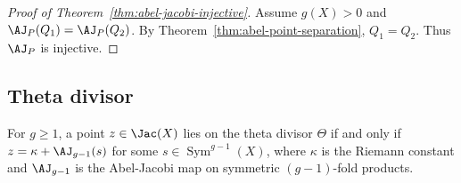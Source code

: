 \begin{proof}[Proof of Theorem~\ref{thm:abel-jacobi-injective}]
Assume \(g(X)>0\) and \(\AJ_P(Q_1)=\AJ_P(Q_2)\). By
Theorem~\ref{thm:abel-point-separation}, \(Q_1=Q_2\). Thus \(\AJ_P\) is
injective.
\end{proof}

\subsection{Theta divisor}

\begin{theorem}
\label{thm:riemann-theorem-theta-divisor}
For \(g\ge 1\), a point \(z\in\Jac(X)\) lies on the theta divisor
\(\Theta\) if and only if \(z = \kappa + \AJ_{g-1}(s)\) for some
\(s\in\operatorname{Sym}^{g-1}(X)\), where \(\kappa\) is the Riemann
constant and \(\AJ_{g-1}\) is the Abel-Jacobi map on symmetric
\((g-1)\)-fold products.
\leanok
\end{theorem}
